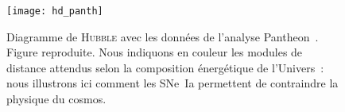 \documentclass[../main/main.tex]{subfiles}
\begin{document}
\vfill
\begin{figure}[h]
    \centering
    \texttt{[image: hd\_panth]}
    \caption[Diagramme de \textsc{Hubble} avec les données de l'analyse
    Pantheon]{Diagramme de \textsc{Hubble} avec les données de l'analyse
        Pantheon~\citep{scolnic2018}. Figure reproduite. Nous indiquons en
        couleur les modules de distance attendus selon la composition
        énergétique de l'Univers~: nous illustrons ici comment les SNe~Ia
    permettent de contraindre la physique du cosmos.}\label{fig:hubdiag}
\end{figure}
\vfill

\newpage

\thispagestyle{plain}
\vspace*{\fill}
\minilof
\vspace*{\fill}

% 
% 
\end{document}

